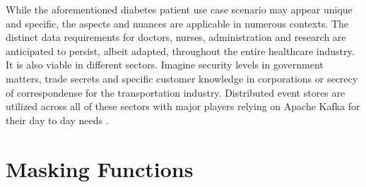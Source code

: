 While the aforementioned diabetes patient use case scenario may appear unique and specific, the aspects and nuances are applicable in numerous contexts. The distinct data requirements for doctors, nurses, administration and research are anticipated to persist, albeit adapted, throughout the entire healthcare industry. 
It is also viable in different sectors. Imagine security levels in government matters, trade secrets and specific customer knowledge in corporations or secrecy of correspondense for the transportation industry. Distributed event stores are utilized across all of these sectors with major players relying on Apache Kafka for their day to day needs \cite{KafkaPoweredBY}. 

\section{Masking Functions}

